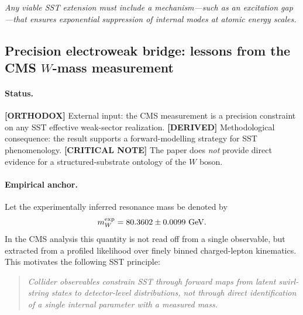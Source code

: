 \documentclass[11pt]{article}
\theoremstyle{definition}
\theoremstyle{plain}
\theoremstyle{remark}
\begin{document}
        \begin{center}
            \textit{
                Any viable SST extension must include a mechanism—such as an excitation gap—that ensures exponential suppression of internal modes at atomic energy scales.
            }
        \end{center}

    \subsection{Precision electroweak bridge: lessons from the CMS \texorpdfstring{$W$}{W}-mass measurement}
        \label{subsec:cms-w-mass-bridge}
    
        \paragraph{Status.}
            \textbf{[ORTHODOX]} External input: the CMS measurement is a precision constraint on any SST effective weak-sector realization.
            \textbf{[DERIVED]} Methodological consequence: the result supports a forward-modelling strategy for SST phenomenology.
            \textbf{[CRITICAL NOTE]} The paper does \emph{not} provide direct evidence for a structured-substrate ontology of the $W$ boson.
    
        \paragraph{Empirical anchor.}
            Let the experimentally inferred resonance mass be denoted by
            \begin{equation}
                m_W^{\rm exp} = 80.3602 \pm 0.0099~{\rm GeV}.
            \end{equation}
            In the CMS analysis this quantity is not read off from a single observable, but extracted from a profiled likelihood over finely binned charged-lepton kinematics. This motivates the following SST principle:
            
            \begin{quote}
                \emph{Collider observables constrain SST through forward maps from latent swirl-string states to detector-level distributions, not through direct identification of a single internal parameter with a measured mass.}
            \end{quote}
    
\end{document}
